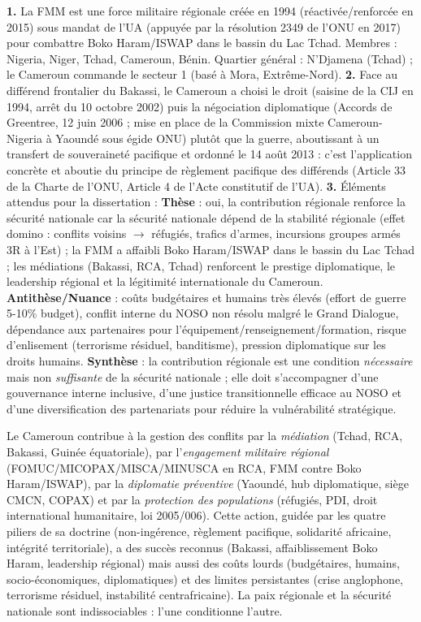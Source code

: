 \documentclass[11pt]{article}
\begin{document}
\begin{corrige}[Exercice n° 1]
\textbf{1.} La FMM est une force militaire régionale créée en 1994 (réactivée/renforcée en 2015) sous mandat de l'UA (appuyée par la résolution 2349 de l'ONU en 2017) pour combattre Boko Haram/ISWAP dans le bassin du Lac Tchad. Membres : Nigeria, Niger, Tchad, Cameroun, Bénin. Quartier général : N'Djamena (Tchad) ; le Cameroun commande le secteur 1 (basé à Mora, Extrême-Nord).
\textbf{2.} Face au différend frontalier du Bakassi, le Cameroun a choisi le droit (saisine de la CIJ en 1994, arrêt du 10 octobre 2002) puis la négociation diplomatique (Accords de Greentree, 12 juin 2006 ; mise en place de la Commission mixte Cameroun-Nigeria à Yaoundé sous égide ONU) plutôt que la guerre, aboutissant à un transfert de souveraineté pacifique et ordonné le 14 août 2013 : c'est l'application concrète et aboutie du principe de règlement pacifique des différends (Article 33 de la Charte de l'ONU, Article 4 de l'Acte constitutif de l'UA).
\textbf{3.} Éléments attendus pour la dissertation : \textbf{Thèse} : oui, la contribution régionale renforce la sécurité nationale car la sécurité nationale dépend de la stabilité régionale (effet domino : conflits voisins $\rightarrow$ réfugiés, trafics d'armes, incursions groupes armés 3R à l'Est) ; la FMM a affaibli Boko Haram/ISWAP dans le bassin du Lac Tchad ; les médiations (Bakassi, RCA, Tchad) renforcent le prestige diplomatique, le leadership régional et la légitimité internationale du Cameroun. \textbf{Antithèse/Nuance} : coûts budgétaires et humains très élevés (effort de guerre 5-10\% budget), conflit interne du NOSO non résolu malgré le Grand Dialogue, dépendance aux partenaires pour l'équipement/renseignement/formation, risque d'enlisement (terrorisme résiduel, banditisme), pression diplomatique sur les droits humains. \textbf{Synthèse} : la contribution régionale est une condition \emph{nécessaire} mais non \emph{suffisante} de la sécurité nationale ; elle doit s'accompagner d'une gouvernance interne inclusive, d'une justice transitionnelle efficace au NOSO et d'une diversification des partenariats pour réduire la vulnérabilité stratégique.
\end{corrige}

\begin{aretenir}
Le Cameroun contribue à la gestion des conflits par la \emph{médiation} (Tchad, RCA, Bakassi, Guinée équatoriale), par l'\emph{engagement militaire régional} (FOMUC/MICOPAX/MISCA/MINUSCA en RCA, FMM contre Boko Haram/ISWAP), par la \emph{diplomatie préventive} (Yaoundé, hub diplomatique, siège CMCN, COPAX) et par la \emph{protection des populations} (réfugiés, PDI, droit international humanitaire, loi 2005/006). Cette action, guidée par les quatre piliers de sa doctrine (non-ingérence, règlement pacifique, solidarité africaine, intégrité territoriale), a des succès reconnus (Bakassi, affaiblissement Boko Haram, leadership régional) mais aussi des coûts lourds (budgétaires, humains, socio-économiques, diplomatiques) et des limites persistantes (crise anglophone, terrorisme résiduel, instabilité centrafricaine). La paix régionale et la sécurité nationale sont indissociables : l'une conditionne l'autre.
\end{aretenir}
\end{document}
